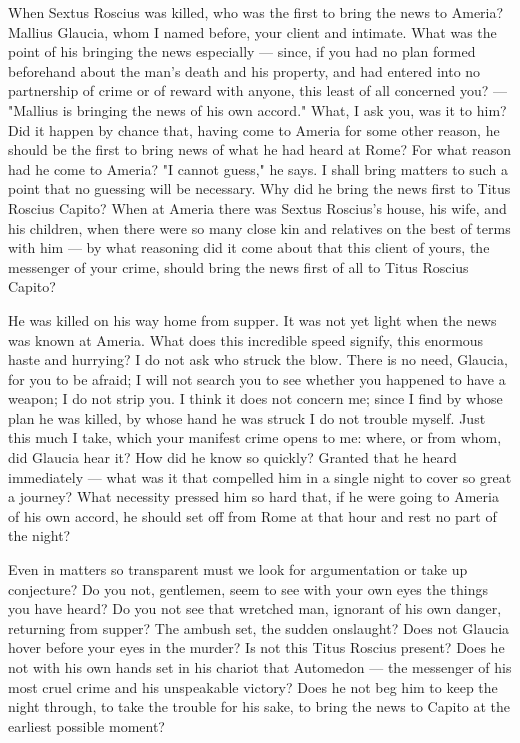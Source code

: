  When Sextus Roscius was killed, who was the first to bring the news to Ameria? Mallius Glaucia, whom I named before, your client and intimate. What was the point of his bringing the news especially --- since, if you had no plan formed beforehand about the man's death and his property, and had entered into no partnership of crime or of reward with anyone, this least of all concerned you? --- "Mallius is bringing the news of his own accord." What, I ask you, was it to him? Did it happen by chance that, having come to Ameria for some other reason, he should be the first to bring news of what he had heard at Rome? For what reason had he come to Ameria? "I cannot guess," he says. I shall bring matters to such a point that no guessing will be necessary. Why did he bring the news first to Titus Roscius Capito? When at Ameria there was Sextus Roscius's house, his wife, and his children, when there were so many close kin and relatives on the best of terms with him --- by what reasoning did it come about that this client of yours, the messenger of your crime, should bring the news first of all to Titus Roscius Capito?

 He was killed on his way home from supper. It was not yet light when the news was known at Ameria. What does this incredible speed signify, this enormous haste and hurrying? I do not ask who struck the blow. There is no need, Glaucia, for you to be afraid; I will not search you to see whether you happened to have a weapon; I do not strip you. I think it does not concern me; since I find by whose plan he was killed, by whose hand he was struck I do not trouble myself. Just this much I take, which your manifest crime opens to me: where, or from whom, did Glaucia hear it? How did he know so quickly? Granted that he heard immediately --- what was it that compelled him in a single night to cover so great a journey? What necessity pressed him so hard that, if he were going to Ameria of his own accord, he should set off from Rome at that hour and rest no part of the night?

 Even in matters so transparent must we look for argumentation or take up conjecture? Do you not, gentlemen, seem to see with your own eyes the things you have heard? Do you not see that wretched man, ignorant of his own danger, returning from supper? The ambush set, the sudden onslaught? Does not Glaucia hover before your eyes in the murder? Is not this Titus Roscius present? Does he not with his own hands set in his chariot that Automedon --- the messenger of his most cruel crime and his unspeakable victory? Does he not beg him to keep the night through, to take the trouble for his sake, to bring the news to Capito at the earliest possible moment?

